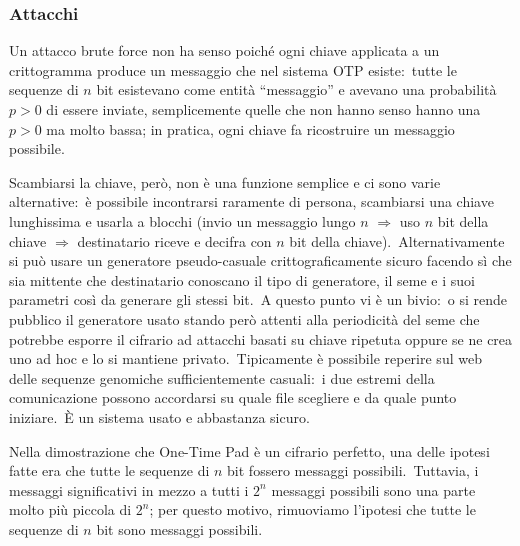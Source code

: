 \subsubsection{Attacchi}

Un attacco brute force non ha senso poiché ogni chiave applicata a un crittogramma produce un messaggio che nel sistema OTP esiste:\ tutte le sequenze di $n$ bit esistevano come entità ``messaggio'' e avevano una probabilità $p > 0$ di essere inviate, semplicemente quelle che non hanno senso hanno una $p > 0$ ma molto bassa; in pratica, ogni chiave fa ricostruire un messaggio possibile.\

Scambiarsi la chiave, però, non è una funzione semplice e ci sono varie alternative:\ è possibile incontrarsi raramente di persona, scambiarsi una chiave lunghissima e usarla a blocchi (invio un messaggio lungo $n$ $\Rightarrow$ uso $n$ bit della chiave $\Rightarrow$ destinatario riceve e decifra con $n$ bit della chiave).\
Alternativamente si può usare un generatore pseudo-casuale crittograficamente sicuro facendo sì che sia mittente che destinatario conoscano il tipo di generatore, il seme e i suoi parametri così da generare gli stessi bit.\
A questo punto vi è un bivio:\ o si rende pubblico il generatore usato stando però attenti alla periodicità del seme che potrebbe esporre il cifrario ad attacchi basati su chiave ripetuta oppure se ne crea uno ad hoc e lo si mantiene privato.\
Tipicamente è possibile reperire sul web delle sequenze genomiche sufficientemente casuali:\ i due estremi della comunicazione possono accordarsi su quale file scegliere e da quale punto iniziare.\
È un sistema usato e abbastanza sicuro.

Nella dimostrazione che One-Time Pad è un cifrario perfetto, una delle ipotesi fatte era che tutte le sequenze di $n$ bit fossero messaggi possibili.\
Tuttavia, i messaggi significativi in mezzo a tutti i $2^n$ messaggi possibili sono una parte molto più piccola di $2^n$; per questo motivo, rimuoviamo l'ipotesi che tutte le sequenze di $n$ bit sono messaggi possibili.\

